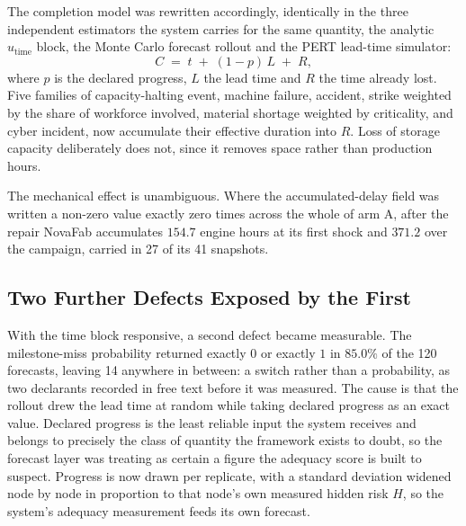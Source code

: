 The completion model was rewritten accordingly, identically in the three independent
estimators the system carries for the same quantity, the analytic $u_{\text{time}}$ block, the
Monte Carlo forecast rollout and the PERT lead-time simulator:
\begin{equation}
    C \;=\; t \;+\; (1 - p)\,L \;+\; R,
    \label{eq:completion_repaired}
\end{equation}
where $p$ is the declared progress, $L$ the lead time and $R$ the time already lost. Five
families of capacity-halting event, machine failure, accident, strike weighted by the share
of workforce involved, material shortage weighted by criticality, and cyber incident, now
accumulate their effective duration into $R$. Loss of storage capacity deliberately does not,
since it removes space rather than production hours.

The mechanical effect is unambiguous. Where the accumulated-delay field was written a non-zero
value exactly zero times across the whole of arm A, after the repair NovaFab accumulates
$154.7$ engine hours at its first shock and $371.2$ over the campaign, carried in 27 of its 41
snapshots.

\subsection{Two Further Defects Exposed by the First}

With the time block responsive, a second defect became measurable. The milestone-miss
probability returned exactly $0$ or exactly $1$ in $85.0\%$ of the 120 forecasts, leaving 14
anywhere in between: a switch rather than a probability, as two declarants recorded in free
text before it was measured. The cause is that the rollout drew the lead time at random while
taking declared progress as an exact value. Declared progress is the least reliable input the
system receives and belongs to precisely the class of quantity the framework exists to doubt,
so the forecast layer was treating as certain a figure the adequacy score is built to suspect.
Progress is now drawn per replicate, with a standard deviation widened node by node in
proportion to that node's own measured hidden risk $H$, so the system's adequacy measurement
feeds its own forecast.

